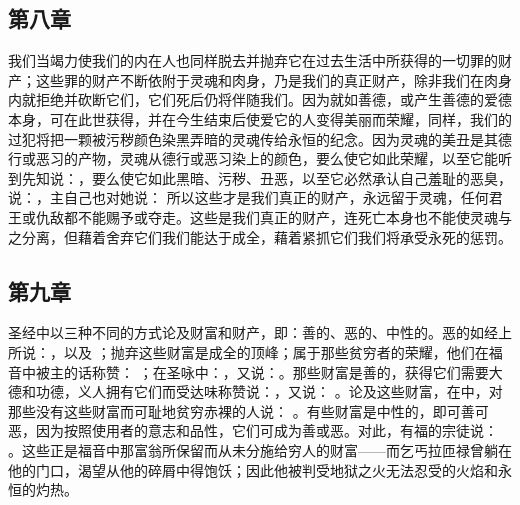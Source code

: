 \subsection{第八章}

\par

我们当竭力使我们的内在人也同样脱去并抛弃它在过去生活中所获得的一切罪的财产；这些罪的财产不断依附于灵魂和肉身，乃是我们的真正财产，除非我们在肉身内就拒绝并砍断它们，它们死后仍将伴随我们。因为就如善德，或产生善德的爱德本身，可在此世获得，并在今生结束后使爱它的人变得美丽而荣耀，同样，我们的过犯将把一颗被污秽颜色染黑弄暗的灵魂传给永恒的纪念。因为灵魂的美丑是其德行或恶习的产物，灵魂从德行或恶习染上的颜色，要么使它如此荣耀，以至它能听到先知说：，要么使它如此黑暗、污秽、丑恶，以至它必然承认自己羞耻的恶臭，说：，主自己也对她说：  所以这些才是我们真正的财产，永远留于灵魂，任何君王或仇敌都不能赐予或夺走。这些是我们真正的财产，连死亡本身也不能使灵魂与之分离，但藉着舍弃它们我们能达于成全，藉着紧抓它们我们将承受永死的惩罚。\par


\subsection{第九章}

\par

圣经中以三种不同的方式论及财富和财产，即：善的、恶的、中性的。恶的如经上所说：，以及 ；抛弃这些财富是成全的顶峰；属于那些贫穷者的荣耀，他们在福音中被主的话称赞： ；在圣咏中：，又说：。那些财富是善的，获得它们需要大德和功德，义人拥有它们而受达味称赞说：，又说： 。论及这些财富，在中，对那些没有这些财富而可耻地贫穷赤裸的人说： 。有些财富是中性的，即可善可恶，因为按照使用者的意志和品性，它们可成为善或恶。对此，有福的宗徒说： 。这些正是福音中那富翁所保留而从未分施给穷人的财富——而乞丐拉匝禄曾躺在他的门口，渴望从他的碎屑中得饱饫；因此他被判受地狱之火无法忍受的火焰和永恒的灼热。\par

